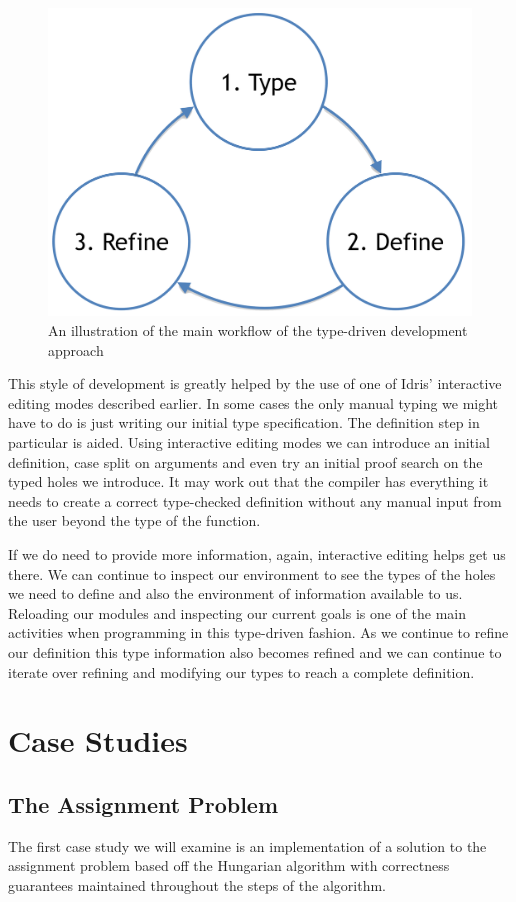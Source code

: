 \documentclass[a4paper, notitlepage]{report}
\begin{document}
\begin{figure}[H]
\centering
\includegraphics[width=0.8\linewidth]{./fig/tdd_cycle.png}
\caption{An illustration of the main workflow of the type-driven development approach}
\end{figure}

This style of development is greatly helped by the use of one of Idris'
interactive editing modes described earlier. In some cases the only manual
typing we might have to do is just writing our initial type specification. The
definition step in particular is aided. Using interactive editing modes we can
introduce an initial definition, case split on arguments and even try an initial
proof search on the typed holes we introduce. It may work out that the compiler
has everything it needs to create a correct type-checked definition without any
manual input from the user beyond the type of the function.

If we do need to provide more information, again, interactive editing helps get
us there. We can continue to inspect our environment to see the types of the
holes we need to define and also the environment of information available to us.
Reloading our modules and inspecting our current goals is one of the main
activities when programming in this type-driven fashion. As we continue to
refine our definition this type information also becomes refined and we can
continue to iterate over refining and modifying our types to reach a complete
definition.
\chapter{Case Studies}
\label{sec:org2037b8f}
\section{The Assignment Problem}
\label{sec:org243397f}
The first case study we will examine is an implementation of a solution to the
assignment problem based off the Hungarian algorithm with correctness guarantees
maintained throughout the steps of the algorithm.
\end{document}
